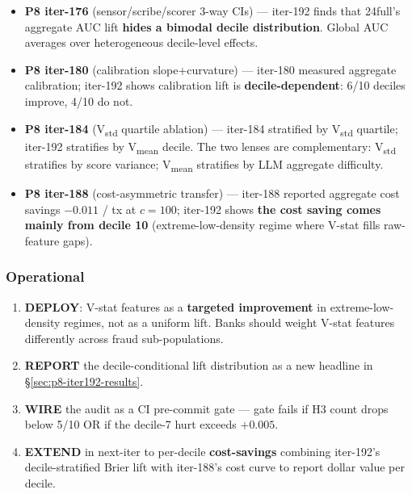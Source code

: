 \documentclass{article}
\begin{document}
\begin{itemize}
\item \textbf{P8 iter-176} (sensor/scribe/scorer 3-way CIs) --- iter-192
  finds that 24full's aggregate AUC lift \textbf{hides a bimodal decile
  distribution}. Global AUC averages over heterogeneous decile-level
  effects.
\item \textbf{P8 iter-180} (calibration slope+curvature) --- iter-180
  measured aggregate calibration; iter-192 shows calibration lift is
  \textbf{decile-dependent}: 6/10 deciles improve, 4/10 do not.
\item \textbf{P8 iter-184} (V\textsubscript{std} quartile ablation) ---
  iter-184 stratified by V\textsubscript{std} quartile; iter-192
  stratifies by V\textsubscript{mean} decile. The two lenses are
  complementary: V\textsubscript{std} stratifies by score variance;
  V\textsubscript{mean} stratifies by LLM aggregate difficulty.
\item \textbf{P8 iter-188} (cost-asymmetric transfer) --- iter-188 reported
  aggregate cost savings $-0.011$ / tx at $c{=}100$; iter-192 shows
  \textbf{the cost saving comes mainly from decile 10} (extreme-low-density
  regime where V-stat fills raw-feature gaps).
\end{itemize}

\subsubsection{Operational}\label{sec:p8-iter192-operational}
\begin{enumerate}
\item \textbf{DEPLOY}: V-stat features as a \textbf{targeted improvement}
  in extreme-low-density regimes, not as a uniform lift. Banks should
  weight V-stat features differently across fraud sub-populations.
\item \textbf{REPORT} the decile-conditional lift distribution as a new
  headline in §\ref{sec:p8-iter192-results}.
\item \textbf{WIRE} the audit as a CI pre-commit gate --- gate fails if
  H3 count drops below 5/10 OR if the decile-7 hurt exceeds $+0.005$.
\item \textbf{EXTEND} in next-iter to per-decile \textbf{cost-savings}
  combining iter-192's decile-stratified Brier lift with iter-188's
  cost curve to report dollar value per decile.
\end{enumerate} 
\end{document}
